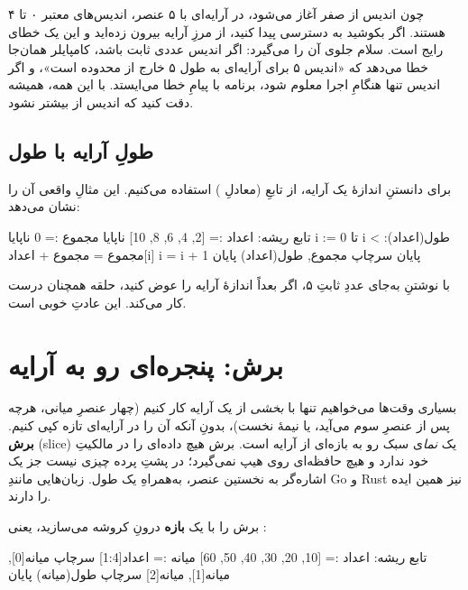 \begin{warn}
چون اندیس از صفر آغاز می‌شود، در آرایه‌ای با ۵ عنصر، اندیس‌های معتبر ۰ تا ۴
هستند. اگر بکوشید به  دسترسی پیدا کنید، از مرزِ آرایه بیرون
زده‌اید و این یک خطای رایج است. سلام جلوی آن را می‌گیرد: اگر اندیس عددی ثابت
باشد، کامپایلر همان‌جا خطا می‌دهد که «اندیس ۵ برای آرایه‌ای به طول ۵ خارج از
محدوده است»، و اگر اندیس تنها هنگامِ اجرا معلوم شود، برنامه با پیامِ خطا
می‌ایستد. با این همه، همیشه دقت کنید که اندیس از  بیشتر نشود.
\end{warn}

\subsection{طولِ آرایه با طول}

برای دانستنِ اندازهٔ یک آرایه، از تابعِ  (معادلِ )
استفاده می‌کنیم. این مثالِ واقعی آن را نشان می‌دهد:

\begin{salamfa}
تابع ریشه:
    اعداد := [2, 4, 6, 8, 10]
    ناپایا مجموع := 0
    ناپایا i := 0
    تا i < طول(اعداد):
        مجموع = مجموع + اعداد[i]
        i = i + 1
    پایان
    سرچاپ مجموع, طول(اعداد)
پایان
\end{salamfa}

با نوشتنِ  به‌جای عددِ ثابتِ ۵، اگر بعداً اندازهٔ آرایه را
عوض کنید، حلقه همچنان درست کار می‌کند. این عادتِ خوبی است.

\section{برش: پنجره‌ای رو به آرایه}

بسیاری وقت‌ها می‌خواهیم تنها با \emph{بخشی} از یک آرایه کار کنیم (چهار عنصرِ
میانی، هرچه پس از عنصرِ سوم می‌آید، یا نیمهٔ نخست)، بدونِ آنکه آن را در آرایه‌ای
تازه کپی کنیم. \textbf{برش} (slice) یک \emph{نما}ی سبک رو به بازه‌ای از آرایه
است. برش هیچ داده‌ای را در مالکیتِ خود ندارد و هیچ حافظه‌ای روی هیپ نمی‌گیرد؛ در
پشتِ پرده چیزی نیست جز یک اشاره‌گر به نخستین عنصر، به‌همراهِ یک طول. زبان‌هایی مانندِ
Go و Rust نیز همین ایده را دارند.

برش را با یک \textbf{بازه} درونِ کروشه می‌سازید، یعنی :

\begin{salamfa}
تابع ریشه:
    اعداد := [10, 20, 30, 40, 50, 60]
    میانه := اعداد[1:4]
    سرچاپ میانه[0], میانه[1], میانه[2]
    سرچاپ طول(میانه)
پایان
\end{salamfa}

